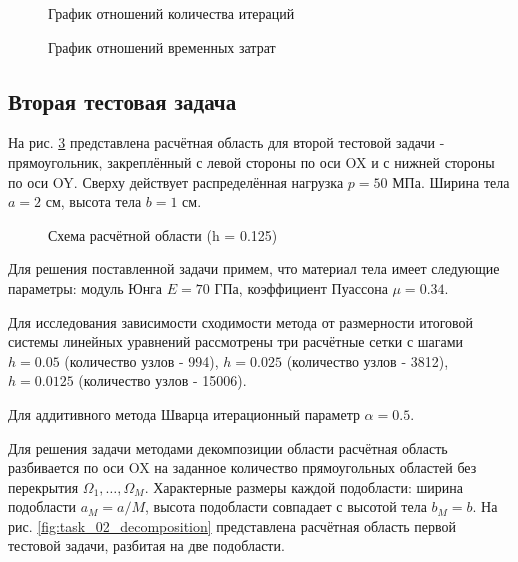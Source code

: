 \documentclass[a4paper, 14pt]{extarticle}
\newcommand{\area}{rectangle}
\newcommand{\task}{3_fixes}
\newcommand{\taskNum}{01}
\begin{document}
\newpage

\begin{figure}[H]
\caption{График отношений количества итераций}
\label{fig:task_\taskNum_iters_cg}
\end{figure}
\begin{figure}[H]
\caption{График отношений временных затрат}
\label{fig:task_\taskNum_time_cg}
\end{figure}

\newpage

\subsection{Вторая тестовая задача}

\renewcommand{\task}{2_fixes}
\renewcommand{\taskNum}{02}

На рис. \ref{fig:task_\taskNum_scheme} представлена расчётная область для второй тестовой задачи - прямоугольник, закреплённый с левой стороны по оси OX и с нижней стороны по оси OY. Сверху действует распределённая нагрузка $p = 50$ МПа. Ширина тела $a = 2$ см, высота тела $b = 1$ см.

\begin{figure}[h]
\caption{Схема расчётной области (h = 0.125)}
\label{fig:task_\taskNum_scheme}
\end{figure}

Для решения поставленной задачи примем, что материал тела имеет следующие параметры: модуль Юнга $E = 70$ ГПа, коэффициент Пуассона $\mu = 0.34$. 

Для исследования зависимости сходимости метода от размерности итоговой системы линейных уравнений рассмотрены три расчётные сетки с шагами $h = 0.05$ (количество узлов - 994), $h = 0.025$ (количество узлов - 3812), $h = 0.0125$ (количество узлов - 15006).

Для аддитивного метода Шварца итерационный параметр $\alpha = 0.5$.

\newpage

Для решения задачи методами декомпозиции области расчётная область разбивается по оси OX на заданное количество прямоугольных областей без перекрытия $\Omega_1, \ldots, \Omega_M$. Характерные размеры каждой подобласти: ширина подобласти $a_M = a / M$, высота подобласти совпадает с высотой тела $b_M = b$. На рис. \ref{fig:task_\taskNum_decomposition} представлена расчётная область первой тестовой задачи, разбитая на две подобласти.
\end{document}

